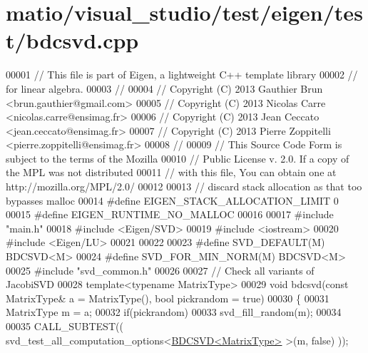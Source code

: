 \hypertarget{matio_2visual__studio_2test_2eigen_2test_2bdcsvd_8cpp_source}{}\section{matio/visual\+\_\+studio/test/eigen/test/bdcsvd.cpp}
\label{matio_2visual__studio_2test_2eigen_2test_2bdcsvd_8cpp_source}

\begin{DoxyCode}
00001 \textcolor{comment}{// This file is part of Eigen, a lightweight C++ template library}
00002 \textcolor{comment}{// for linear algebra.}
00003 \textcolor{comment}{//}
00004 \textcolor{comment}{// Copyright (C) 2013 Gauthier Brun <brun.gauthier@gmail.com>}
00005 \textcolor{comment}{// Copyright (C) 2013 Nicolas Carre <nicolas.carre@ensimag.fr>}
00006 \textcolor{comment}{// Copyright (C) 2013 Jean Ceccato <jean.ceccato@ensimag.fr>}
00007 \textcolor{comment}{// Copyright (C) 2013 Pierre Zoppitelli <pierre.zoppitelli@ensimag.fr>}
00008 \textcolor{comment}{//}
00009 \textcolor{comment}{// This Source Code Form is subject to the terms of the Mozilla}
00010 \textcolor{comment}{// Public License v. 2.0. If a copy of the MPL was not distributed}
00011 \textcolor{comment}{// with this file, You can obtain one at http://mozilla.org/MPL/2.0/}
00012 
00013 \textcolor{comment}{// discard stack allocation as that too bypasses malloc}
00014 \textcolor{preprocessor}{#define EIGEN\_STACK\_ALLOCATION\_LIMIT 0}
00015 \textcolor{preprocessor}{#define EIGEN\_RUNTIME\_NO\_MALLOC}
00016 
00017 \textcolor{preprocessor}{#include "main.h"}
00018 \textcolor{preprocessor}{#include <Eigen/SVD>}
00019 \textcolor{preprocessor}{#include <iostream>}
00020 \textcolor{preprocessor}{#include <Eigen/LU>}
00021 
00022 
00023 \textcolor{preprocessor}{#define SVD\_DEFAULT(M) BDCSVD<M>}
00024 \textcolor{preprocessor}{#define SVD\_FOR\_MIN\_NORM(M) BDCSVD<M>}
00025 \textcolor{preprocessor}{#include "svd\_common.h"}
00026 
00027 \textcolor{comment}{// Check all variants of JacobiSVD}
00028 \textcolor{keyword}{template}<\textcolor{keyword}{typename} MatrixType>
00029 \textcolor{keywordtype}{void} bdcsvd(\textcolor{keyword}{const} MatrixType& a = MatrixType(), \textcolor{keywordtype}{bool} pickrandom = \textcolor{keyword}{true})
00030 \{
00031   MatrixType m = a;
00032   \textcolor{keywordflow}{if}(pickrandom)
00033     svd\_fill\_random(m);
00034 
00035   CALL\_SUBTEST(( svd\_test\_all\_computation\_options<\hyperlink{group___s_v_d___module_class_eigen_1_1_b_d_c_s_v_d}{BDCSVD<MatrixType>} >(m, \textcolor{keyword}{false})  ));

\end{DoxyCode}
